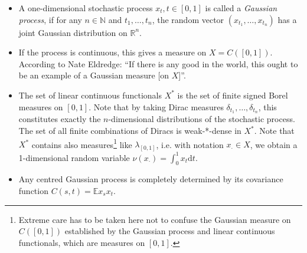 \documentclass{scrartcl}
\theoremstyle{definition}
\theoremstyle{remark}
\newcommand{\de}{\mathrm d}
\newcommand{\N}{\mathbb N}
\newcommand{\R}{\mathbb R}
\newcommand{\E}{\mathbb E}
\begin{document}
\begin{itemize}
\item A one-dimensional stochastic process $x_t, t\in[0,1]$ is called a \textit{Gaussian process}, if for any $n\in \N$ and  $t_1,\ldots, t_n$, the random vector $(x_{t_1},\ldots,x_{t_n})$ has a joint Gaussian distribution on $\R^n$.
\item If the process is continuous, this gives a measure on $X  =C([0,1])$. According to Nate Eldredge: ``If there is any good in the world, this ought to be an example of a Gaussian measure [on $X$]''. 
\item The set of linear continuous functionals $X^*$ is the set of finite signed Borel measures on $[0,1]$. Note that by taking Dirac measures $\delta_{t_1},\ldots,\delta_{t_n}$, this constitutes exactly the $n$-dimensional distributions of the stochastic process. The set of all finite combinations of Diracs is weak-*-dense in $X^*$. Note that $X^*$ contains also measures\footnote{Extreme care has to be taken here not to confuse the Gaussian measure on $C([0,1])$ established by the Gaussian process and linear continuous functionals, which are measures on $[0,1]$.} like $\lambda_{[0,1]}$, i.e. with notation $x_\cdot\in X$, we obtain a 1-dimensional random variable $\nu(x_\cdot) = \int_0^1 x_t \de t$. 
\item Any centred Gaussian process is completely determined by its covariance function $C(s,t) = \E x_s x_t$.
\end{itemize}
\end{document}

